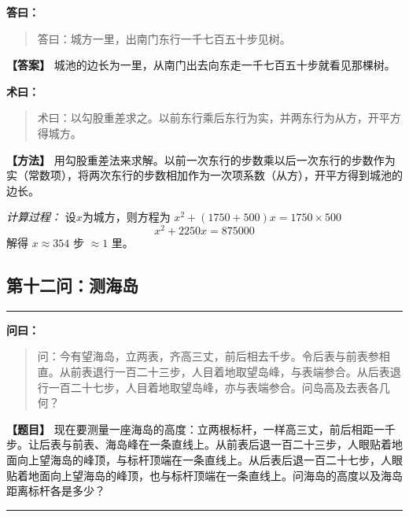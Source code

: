 \documentclass[11pt,a4paper]{article}
\newenvironment{mathproblem}[1][]{%
  \medskip\noindent\rule{\textwidth}{0.4pt}%
  \par\noindent{\Large\bfseries\color{sectioncolor}#1}\par\nopagebreak%
  \smallskip%
}{%
  \par\noindent\rule{\textwidth}{0.4pt}\medskip%
}
\newcommand{\wenlabel}{\textbf{\color{origcolor}问曰：}}
\newcommand{\dalabel}{\textbf{\color{origcolor}答曰：}}
\newcommand{\shulabel}{\textbf{\color{origcolor}术曰：}}
\newcommand{\modwenlabel}{\textbf{\color{modcolor}【题目】}}
\newcommand{\moddalabel}{\textbf{\color{modcolor}【答案】}}
\newcommand{\modshulabel}{\textbf{\color{modcolor}【方法】}}
\begin{document}
\begin{originaltext}
\dalabel
\begin{quote}
\textcolor{origcolor}{%
答曰：城方一里，出南门东行一千七百五十步见树。
}
\end{quote}
\end{originaltext}

\begin{moderntext}
\moddalabel
城池的边长为一里，从南门出去向东走一千七百五十步就看见那棵树。
\end{moderntext}

\begin{originaltext}
\shulabel
\begin{quote}
\textcolor{origcolor}{%
术曰：以勾股重差求之。以前东行乘后东行为实，并两东行为从方，开平方得城方。
}
\end{quote}
\end{originaltext}

\begin{moderntext}
\modshulabel
用勾股重差法来求解。以前一次东行的步数乘以后一次东行的步数作为实（常数项），将两次东行的步数相加作为一次项系数（从方），开平方得到城池的边长。

\textit{计算过程：} 设$x$为城方，则方程为 $x^2 + (1750 + 500)x = 1750 \times 500$
\[
x^2 + 2250x = 875000
\]
解得 $x \approx 354$ 步 $\approx 1$ 里。
\end{moderntext}

\subsection*{第十二问：测海岛}

\begin{mathproblem}[\textbf{第十二问：测海岛}]

\begin{originaltext}
\wenlabel
\begin{quote}
\textcolor{origcolor}{%
问：今有望海岛，立两表，齐高三丈，前后相去千步。令后表与前表参相直。从前表退行一百二十三步，人目着地取望岛峰，与表端参合。从后表退行一百二十七步，人目着地取望岛峰，亦与表端参合。问岛高及去表各几何？
}
\end{quote}
\end{originaltext}

\begin{moderntext}
\modwenlabel
现在要测量一座海岛的高度：立两根标杆，一样高三丈，前后相距一千步。让后表与前表、海岛峰在一条直线上。从前表后退一百二十三步，人眼贴着地面向上望海岛的峰顶，与标杆顶端在一条直线上。从后表后退一百二十七步，人眼贴着地面向上望海岛的峰顶，也与标杆顶端在一条直线上。问海岛的高度以及海岛距离标杆各是多少？
\end{moderntext}

\end{mathproblem}
\end{document}
